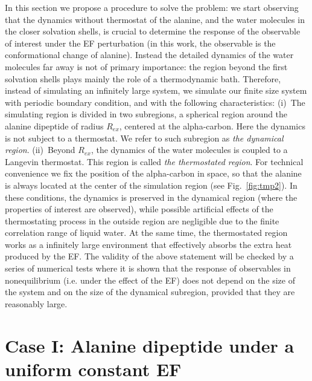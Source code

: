 \documentclass[a4paper,preprint,unsortedaddress,onecolumn]{revtex4-1}
\begin{document}
In this section we propose a procedure to solve the problem: we
start observing that the dynamics without thermostat of the alanine, 
and the water molecules in the closer solvation shells, is
crucial to determine the response of the observable of interest
under the EF perturbation
(in this work, the observable is the conformational change of alanine).
Instead the detailed dynamics of
the water molecules far away is not of primary importance: the region beyond the first solvation shells plays mainly the role of a thermodynamic bath. 
Therefore, instead of simulating an infinitely
large system, we simulate our finite size system with periodic
boundary condition, and with the following characteristics:
(i)~The simulating region is divided in two
subregions, a spherical region around the alanine dipeptide of radius $R_{ex}$,
centered at the alpha-carbon. Here the dynamics is
not subject to a thermostat.
We refer to such subregion as \emph{the  dynamical
region}. (ii)~Beyond $R_{ex}$, the dynamics of the water molecules is coupled
to a Langevin thermostat.  This region is called \emph{the thermostated
region}. For technical convenience we
fix the position of the alpha-carbon in space, so that the alanine is always
located at the center of the simulation region (see Fig.~\ref{fig:tmp2}).
In these conditions, the  dynamics is preserved in the dynamical region (where the properties of interest are observed), while 
possible artificial effects of the thermostating process in the outside region
are negligible due to the finite correlation
range of liquid water.
At the same time, the thermostated region works as a infinitely large
environment that effectively absorbs the extra heat produced by the EF.
The validity of the above
statement will be checked by a series of numerical tests where it is shown that
the response of observables in nonequilibrium (i.e. under the effect of the EF) does not depend on the size of the system
and on the size of the  dynamical subregion, provided that they are
reasonably large.



\section{Case I: Alanine dipeptide
  under a uniform  constant EF}
\end{document}
